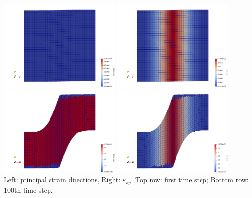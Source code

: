 \begin{center}
\includegraphics[width=6cm]{python_codes/fieldstone_89/results/shearband/old_angle_00}
\includegraphics[width=6cm]{python_codes/fieldstone_89/results/shearband/old_exy_00}\\
\includegraphics[width=6cm]{python_codes/fieldstone_89/results/shearband/old_angle_100}
\includegraphics[width=6cm]{python_codes/fieldstone_89/results/shearband/old_exy_100}\\
{\captionfont Left: principal strain directions, Right: $\varepsilon_{xy}$.
Top row: first time step; Bottom row: 100th time step.}
\end{center}


